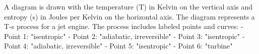 A diagram is drawn with the temperature (T) in Kelvin on the vertical axis and entropy (s) in Joules per Kelvin on the horizontal axis. The diagram represents a T-s process for a jet engine. The process includes labeled points and curves:  
- Point 1: "isentropic"  
- Point 2: "adiabatic, irreversible"  
- Point 3: "isentropic"  
- Point 4: "adiabatic, irreversible"  
- Point 5: "isentropic"  
- Point 6: "turbine"